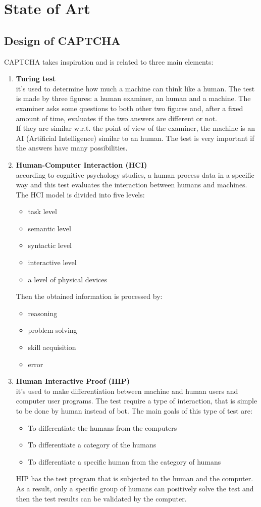 \chapter{State of Art}\label{StateOfArt}
\section{Design of CAPTCHA}
CAPTCHA takes inspiration and is related to three main elements\cite{types_CAPTCHA}:
\begin{enumerate}
\item{\textbf{Turing test}\\
it's used to determine how much a machine can think like a human. The test is made by three figures: a human examiner, an human and a machine. The examiner asks some questions to both other two figures and, after a fixed amount of time, evaluates if the two answers are different or not.\\
If they are similar w.r.t. the point of view of the examiner, the machine is an AI (Artificial Intelligence) similar to an human. The test is very important if the answers have many possibilities. 
}
\item{\textbf{Human-Computer Interaction (HCI)}\\
according to cognitive psychology studies, a human process data in a specific way and this test evaluates the interaction between humans and machines. The HCI model is divided into five levels:
\begin{itemize}
\item{task level}
\item{semantic level}
\item{syntactic level}
\item{interactive level}
\item{a level of physical devices}
\end{itemize}   
Then the obtained information is processed by:
\begin{itemize}
\item{reasoning}
\item{problem solving}
\item{skill acquisition}
\item{error}
\end{itemize}   
}
\item{\textbf{Human Interactive Proof (HIP)}\\
it's used to make differentiation between machine and human users and computer user programs. The test require a type of interaction, that is simple to be done by human instead of bot. The main goals of this type of test are:
\begin{itemize}
\item{To differentiate the humans from the computers}
\item{To differentiate a category of the humans}
\item{To differentiate a specific human from the category of humans}
\end{itemize}
HIP has the test program that is subjected to the human and the computer. As a result, only a specific group of humans can positively solve the test and then the test results can be validated by the computer.
}
\end{enumerate}
